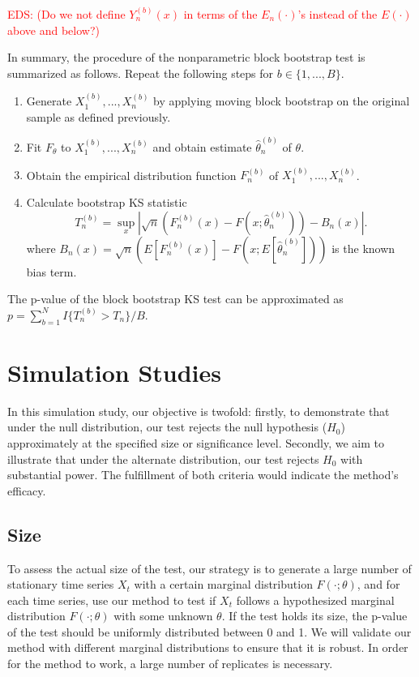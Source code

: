 \documentclass[APA,Times1COL]{WileyNJDv5} %
\newcommand{\eds}[1]{\textcolor{red}{EDS: (#1)}}
\begin{document}
\eds{Do we not define $Y^{(b)}_n(x)$ in terms of the $E_n(\cdot)$'s instead of 
the $E(\cdot)$ above and below?}

In summary, the procedure of the nonparametric block bootstrap test is 
summarized as follows. Repeat the following steps for $b \in \{1, ..., B\}$.
\begin{enumerate}
\item
  Generate $X^{(b)}_1,...,X^{(b)}_n$ by applying moving block bootstrap 
  on the original sample as
  defined previously.
\item
  Fit $F_\theta$ to $X^{(b)}_1,...,X^{(b)}_n$ and obtain estimate 
	$\hat\theta^{(b)}_n$ of $\theta$.
\item
  Obtain the empirical distribution function $F^{(b)}_n$ of
  $X^{(b)}_1,...,X^{(b)}_n$. 
\item
  Calculate bootstrap KS statistic
  \[
    T^{(b)}_n = \sup_x | \sqrt{n}\left(F^{(b)}_n(x) 
    - F(x; \hat\theta^{(b)}_n)\right) - B_n(x) |.
  \]
  where 
  $B_{n}(x) = \sqrt{n}(E[F^{(b)}_n(x)] - 
  F(x; E[\hat\theta^{(b)}_n]))$ is the known
  bias term.
\end{enumerate}


The p-value of the block bootstrap KS test can be approximated
as $p = \sum_{b=1}^N I\{T^{(b)}_n > T_n\} / B$.

\section{Simulation Studies}\label{sec:simu}

In this simulation study, our objective is twofold: firstly, to demonstrate that
under the null distribution, our test rejects the null hypothesis ($H_0$) 
approximately at the specified size or significance level. Secondly, we aim to
illustrate that under the alternate distribution, our test rejects
$H_0$ with substantial power. The fulfillment of both criteria would indicate
the method's efficacy.


\subsection{Size}
To assess the actual size of the test, our strategy is to
generate a large number of stationary time series $X_t$ with a certain marginal
distribution $F(\cdot; \theta)$, and for each time series, use our method to
test if $X_t$ follows a hypothesized marginal distribution $F(\cdot; \theta)$
with some unknown $\theta$. If the test holds its size, the p-value
of the test should be uniformly distributed between 0 and 1. We will validate
our method with different marginal distributions to ensure that it is robust.
In order for the method to work, a large number of replicates is necessary. 
\end{document}
